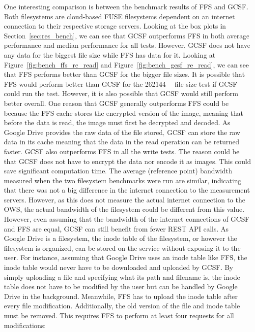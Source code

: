One interesting comparison is between the benchmark results of \gls{FFS} and \gls{GCSF}. Both filesystems are \mbox{cloud-based} \gls{FUSE} filesystems dependent on an internet connection to their respective storage servers. Looking at the box plots in Section~\ref{sec:res_bench}, we can see that \gls{GCSF} outperforms \gls{FFS} in both average performance and median performance for all tests. However, \gls{GCSF} does not have any data for the biggest file size while \gls{FFS} has data for it. Looking at Figure~\ref{fig:bench_ffs_re_read} and Figure~\ref{fig:bench_gcsf_re_read}, we can see that \gls{FFS} performs better than \gls{GCSF} for the bigger file sizes. It is possible that \gls{FFS} would perform better than \gls{GCSF} for the \SI{262144}{\kilo\byte} file size test if \gls{GCSF} could run the test. However, it is also possible that \gls{GCSF} would still perform better overall. One reason that \gls{GCSF} generally outperforms \gls{FFS} could be because the \gls{FFS} cache stores the encrypted version of the image, meaning that before the data is read, the image must first be decrypted and decoded. As Google Drive provides the raw data of the file stored, \gls{GCSF} can store the raw data in its cache meaning that the data in the read operation can be returned faster. \gls{GCSF} also outperforms \gls{FFS} in all the write tests. The reason could be that \gls{GCSF} does not have to encrypt the data nor encode it as images. This could save significant computation time. The average (reference point) bandwidth measured when the two filesystem benchmarks were run are similar, indicating that there was not a big difference in the internet connection to the measurement servers. However, as this does not measure the actual internet connection to the \gls{OWS}, the actual bandwidth of the filesystem could be different from this value. However, even assuming that the bandwidth of the internet connections of \gls{GCSF} and \gls{FFS} are equal, \gls{GCSF} can still benefit from fewer REST API calls. As Google Drive is a filesystem, the inode table of the filesystem, or however the filesystem is organized, can be stored on the service without exposing it to the user. For instance, assuming that Google Drive uses an inode table like \gls{FFS}, the inode table would never have to be downloaded and uploaded by \gls{GCSF}. By simply uploading a file and specifying what its path and filename is, the inode table does not have to be modified by the user but can be handled by Google Drive in the background. Meanwhile, \gls{FFS} has to upload the inode table after every file modification. Additionally, the old version of the file and inode table must be removed. This requires \gls{FFS} to perform at least four requests for all modifications:
